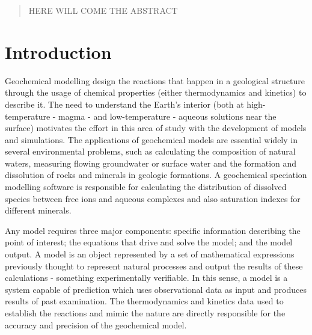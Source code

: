 \documentclass[ppgc,mestrado,english]{iiufrgs}
\begin{document}

\listoffigures



\renewcommand*\abstractname{Abstract}
\begin{abstract}    
HERE WILL COME THE ABSTRACT
\end{abstract}


\chapter{Introduction} 
\label{chapter:intro}


Geochemical modelling design the reactions that happen in a geological structure through the usage of chemical properties (either thermodynamics and kinetics) to describe it. The need to understand the Earth's interior (both at high-temperature - magma - and low-temperature - aqueous solutions near the surface) motivates the effort in this area of study with the development of models and simulations. The applications of geochemical models are essential widely in several environmental problems, such as calculating the composition of natural waters, measuring flowing groundwater or surface water and the formation and dissolution of rocks and minerals in geologic formations. A geochemical speciation modelling software is responsible for calculating the distribution of dissolved species between free ions and aqueous complexes and also saturation indexes for different minerals. 


Any model requires three major components: specific information describing the point of interest; the equations that drive and solve the model; and the model output. A model is an object represented by a set of mathematical expressions previously thought to represent natural processes and output the results of these calculations - something experimentally verifiable. In this sense, a model is a system capable of prediction which uses observational data as input and produces results of past examination. The thermodynamics and kinetics data used to establish the reactions and mimic the nature are directly responsible for the accuracy and precision of the geochemical model.
\end{document}
